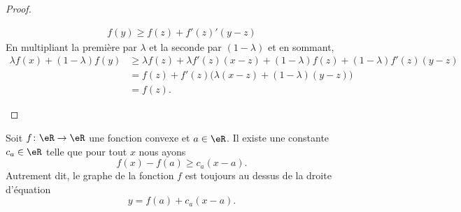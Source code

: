 \begin{proof}
\begin{subproof}
\begin{subequations}
\begin{align}
				f(y)\geq f(z)+f'(z)'(y-z)
			\end{align}
		\end{subequations}
		En multipliant la première par \( \lambda\) et la seconde par \( (1-\lambda)\) et en sommant,
		\begin{subequations}
			\begin{align}
				\lambda f(x)+(1-\lambda)f(y) & \geq  \lambda f(z)+\lambda f'(z)(x-z)+(1-\lambda)f(z)+(1-\lambda)f'(z)(y-z) \\
				                             & =   f(z)+f'(z)\big( \lambda(x-z)+(1-\lambda)(y-z) \big)                     \\
				                             & =   f(z).
			\end{align}
		\end{subequations}
	\end{subproof}
\end{proof}

\begin{proposition} \label{PropNIBooSbXIKO}
	Soit \( f\colon \eR\to \eR \) une fonction convexe et \( a\in \eR\). Il existe une constante \( c_a\in \eR\) telle que pour tout \( x\) nous ayons
	\begin{equation}    \label{EqSKIooSeAekM}
		f(x)-f(a)\geq c_a(x-a).
	\end{equation}
	Autrement dit, le graphe de la fonction \( f\) est toujours au dessus de la droite d'équation
	\begin{equation}
		y=f(a)+c_a(x-a).
	\end{equation}
\end{proposition}

